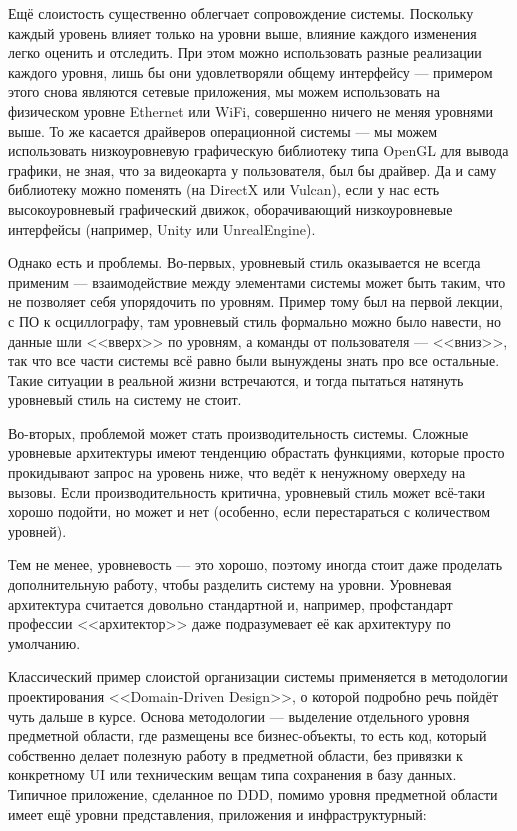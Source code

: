 \documentclass[a5paper]{article}
\begin{document}
Ещё слоистость существенно облегчает сопровождение системы. Поскольку каждый уровень влияет только на уровни выше, влияние каждого изменения легко оценить и отследить. При этом можно использовать разные реализации каждого уровня, лишь бы они удовлетворяли общему интерфейсу --- примером этого снова являются сетевые приложения, мы можем использовать на физическом уровне Ethernet или WiFi, совершенно ничего не меняя уровнями выше. То же касается драйверов операционной системы --- мы можем использовать низкоуровневую графическую библиотеку типа OpenGL для вывода графики, не зная, что за видеокарта у пользователя, был бы драйвер. Да и саму библиотеку можно поменять (на DirectX или Vulcan), если у нас есть высокоуровневый графический движок, оборачивающий низкоуровневые интерфейсы (например, Unity или UnrealEngine).

Однако есть и проблемы. Во-первых, уровневый стиль оказывается не всегда применим --- взаимодействие между элементами системы может быть таким, что не позволяет себя упорядочить по уровням. Пример тому был на первой лекции, с ПО к осциллографу, там уровневый стиль формально можно было навести, но данные шли <<вверх>> по уровням, а команды от пользователя --- <<вниз>>, так что все части системы всё равно были вынуждены знать про все остальные. Такие ситуации в реальной жизни встречаются, и тогда пытаться натянуть уровневый стиль на систему не стоит. 

Во-вторых, проблемой может стать производительность системы. Сложные уровневые архитектуры имеют тенденцию обрастать функциями, которые просто прокидывают запрос на уровень ниже, что ведёт к ненужному оверхеду на вызовы. Если производительность критична, уровневый стиль может всё-таки хорошо подойти, но может и нет (особенно, если перестараться с количеством уровней). 

Тем не менее, уровневость --- это хорошо, поэтому иногда стоит даже проделать дополнительную работу, чтобы разделить систему на уровни. Уровневая архитектура считается довольно стандартной и, например, профстандарт профессии <<архитектор>> даже подразумевает её как архитектуру по умолчанию.

Классический пример слоистой организации системы применяется в методологии проектирования <<Domain-Driven Design>>, о которой подробно речь пойдёт чуть дальше в курсе. Основа методологии --- выделение отдельного уровня предметной области, где размещены все бизнес-объекты, то есть код, который собственно делает полезную работу в предметной области, без привязки к конкретному UI или техническим вещам типа сохранения в базу данных. Типичное приложение, сделанное по DDD, помимо уровня предметной области имеет ещё уровни представления, приложения и инфраструктурный:
\end{document}
